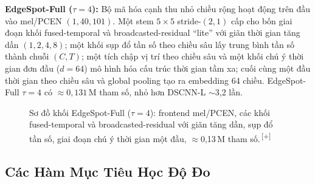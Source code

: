 \documentclass[12pt,a4paper]{report}
\newcommand{\NEW}[1]{{\color{addcolor}#1\,\textsuperscript{\tiny[+]}}}
\newcommand{\NEW}[1]{#1}
\begin{document}
\textbf{EdgeSpot-Full ($\tau{=}4$):} Bộ mã hóa cạnh thu nhỏ chiều rộng hoạt động
trên đầu vào mel/PCEN $(1,40,101)$. Một stem $5{\times}5$ stride-$(2,1)$ cấp cho
bốn giai đoạn khối fused-temporal và broadcasted-residual ``lite'' với giãn thời
gian tăng dần $(1,2,4,8)$; một khối sụp đổ tần số theo chiều sâu lấy trung bình
tần số thành chuỗi $(C,T)$; một tích chập vị trí theo chiều sâu và một khối chú ý
thời gian đơn đầu ($d = 64$) mô hình hóa cấu trúc thời gian tầm xa; cuối cùng
một đầu thời gian theo chiều sâu và global pooling tạo ra embedding 64 chiều.
EdgeSpot-Full $\tau{=}4$ có $\approx 0{,}131$\,M tham số, nhỏ hơn DSCNN-L
$\sim$3{,}2 lần.

\begin{figure}[H]
\centering
{}
\caption{\NEW{Sơ đồ khối EdgeSpot-Full ($\tau{=}4$): frontend mel/PCEN, các khối
fused-temporal và broadcasted-residual với giãn tăng dần, sụp đổ tần số, giai đoạn
chú ý thời gian một đầu, $\approx$0{,}13\,M tham số.}}
\label{fig:edgespot}
\end{figure}

\subsection{Các Hàm Mục Tiêu Học Độ Đo}\label{sec:losses}
\end{document}
